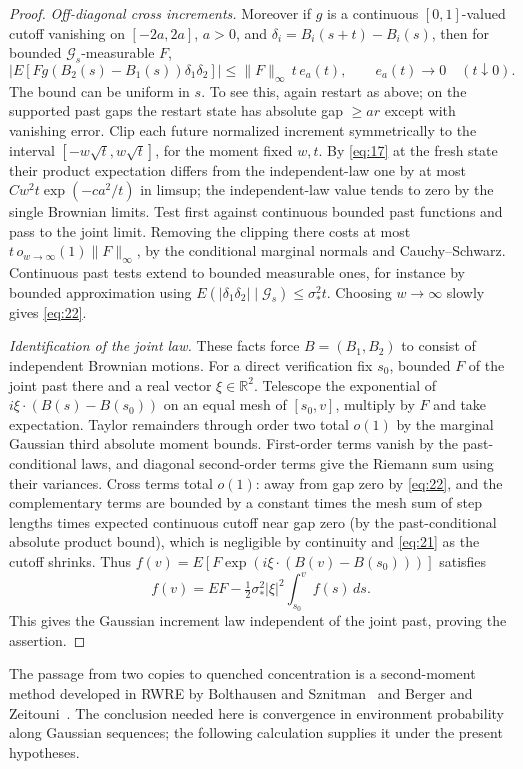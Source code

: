 \begin{proof}
\emph{Off-diagonal cross increments.}
Moreover if \(g\) is a continuous \([0,1]\)-valued cutoff vanishing on \([-2a,2a]\), \(a>0\), and \(\delta_i=B_i(s+t)-B_i(s)\), then for bounded \(\mathcal G_s\)-measurable \(F\),
\[
\big|E[F g(B_2(s)-B_1(s))\delta_1\delta_2]\big|
\le \|F\|_\infty\, t\,e_a(t),\qquad e_a(t)\longrightarrow0\quad(t\downarrow0).
\tag{22}\label{eq:22}
\]
The bound can be uniform in \(s\). To see this, again restart as above; on the supported past gaps the restart state has absolute gap \(\ge a r\) except with vanishing error. Clip each future normalized increment symmetrically to the interval \([-w\sqrt t,w\sqrt t]\), for the moment fixed \(w,t\). By \eqref{eq:17} at the fresh state their product expectation differs from the independent-law one by at most \(Cw^2 t\exp(-c a^2/t)\) in limsup; the independent-law value tends to zero by the single Brownian limits. Test first against continuous bounded past functions and pass to the joint limit. Removing the clipping there costs at most \(t\,o_{w\to\infty}(1)\|F\|_\infty\), by the conditional marginal normals and Cauchy--Schwarz. Continuous past tests extend to bounded measurable ones, for instance by bounded approximation using \(E(|\delta_1\delta_2|\mid\mathcal G_s)\le \sigma_*^2 t\). Choosing \(w\to\infty\) slowly gives \eqref{eq:22}.

\emph{Identification of the joint law.}
These facts force \(B=(B_1,B_2)\) to consist of independent Brownian motions. For a direct verification fix \(s_0\), bounded \(F\) of the joint past there and a real vector \(\xi\in\mathbb R^2\). Telescope the exponential of \(i\xi\cdot(B(s)-B(s_0))\) on an equal mesh of \([s_0,v]\), multiply by \(F\) and take expectation. Taylor remainders through order two total \(o(1)\) by the marginal Gaussian third absolute moment bounds. First-order terms vanish by the past-conditional laws, and diagonal second-order terms give the Riemann sum using their variances. Cross terms total \(o(1)\): away from gap zero by \eqref{eq:22}, and the complementary terms are bounded by a constant times the mesh sum of step lengths times expected continuous cutoff near gap zero (by the past-conditional absolute product bound), which is negligible by continuity and \eqref{eq:21} as the cutoff shrinks. Thus \(f(v)=E[F\exp(i\xi\cdot(B(v)-B(s_0)))]\) satisfies
\[
f(v)=E F-\tfrac12\sigma_*^2|\xi|^2\int_{s_0}^v f(s)\,ds .
\]
This gives the Gaussian increment law independent of the joint past, proving the assertion.
\end{proof}

The passage from two copies to quenched concentration is a second-moment
method developed in RWRE by Bolthausen and
Sznitman~\cite[Lemma~4.1]{BolthausenSznitman2002} and Berger and
Zeitouni~\cite[Section~2]{BergerZeitouni2008}. The conclusion needed here
is convergence in environment probability along Gaussian sequences; the
following calculation supplies it under the present hypotheses.

